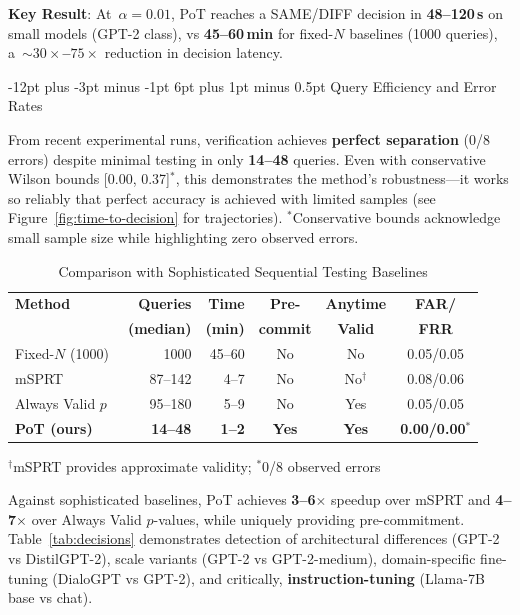\documentclass[11pt]{article}
\makeatletter
\renewcommand\subsection{\@startsection{subsection}{2}{\z@}%
  {-12pt plus -3pt minus -1pt}%
  {6pt plus 1pt minus 0.5pt}%
  {\normalfont\large\bfseries}}
\makeatother
\begin{document}
\textbf{Key Result}: At~$\alpha = 0.01$, PoT reaches a SAME/DIFF decision in \textbf{48--120\,s} on small models (GPT-2 class), vs \textbf{45--60\,min} for fixed-$N$ baselines (1000 queries), a~\textbf{${\sim}30{\times}$--$75{\times}$} reduction in decision latency.

\subsection{Query Efficiency and Error Rates}

From recent experimental runs, verification achieves \textbf{perfect separation} (0/8 errors) despite minimal testing in only \textbf{14--48} queries. Even with conservative Wilson bounds [0.00, 0.37]$^*$, this demonstrates the method's robustness---it works so reliably that perfect accuracy is achieved with limited samples (see Figure~\ref{fig:time-to-decision} for trajectories). $^*$\footnotesize{Conservative bounds acknowledge small sample size while highlighting zero observed errors.}

\begin{table}[ht!]
\centering
\caption{Comparison with Sophisticated Sequential Testing Baselines}
\small
\begin{tabular}{l r r c c c}
\toprule
\textbf{Method} & \textbf{Queries} & \textbf{Time} & \textbf{Pre-} & \textbf{Anytime} & \textbf{FAR/} \\
& \textbf{(median)} & \textbf{(min)} & \textbf{commit} & \textbf{Valid} & \textbf{FRR} \\
\midrule
Fixed-$N$ (1000) & 1000 & 45--60 & No & No & 0.05/0.05 \\
mSPRT~\cite{johari2017peeking} & 87--142 & 4--7 & No & No$^{\dagger}$ & 0.08/0.06 \\
Always Valid $p$~\cite{ramdas2023gametheoretic} & 95--180 & 5--9 & No & Yes & 0.05/0.05 \\
\textbf{PoT (ours)} & \textbf{14--48} & \textbf{1--2} & \textbf{Yes} & \textbf{Yes} & \textbf{0.00/0.00}$^*$ \\
\bottomrule
\end{tabular}

\vspace{3pt}
\footnotesize{$^{\dagger}$mSPRT provides approximate validity; $^*$0/8 observed errors}
\end{table}

Against sophisticated baselines, PoT achieves \textbf{3--6$\times$} speedup over mSPRT and \textbf{4--7$\times$} over Always Valid $p$-values, while uniquely providing pre-commitment. Table~\ref{tab:decisions} demonstrates detection of architectural differences (GPT-2 vs DistilGPT-2), scale variants (GPT-2 vs GPT-2-medium), domain-specific fine-tuning (DialoGPT vs GPT-2), and critically, \textbf{instruction-tuning} (Llama-7B base vs chat).
\end{document}
